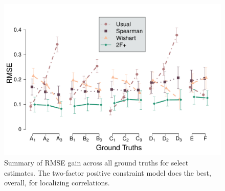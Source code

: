 \documentclass[man, 12pt]{apa7} %
\begin{document}
\begin{figure}[htbp]
    \centering  %
    \includegraphics[width=\linewidth, height=1.1\linewidth, keepaspectratio]{_figs/rmse-snap.pdf}
    \caption{Summary of RMSE gain across all ground truths for select estimates. The two-factor positive constraint model does the best, overall, for localizing correlations.} 
    \label{fig:rmse-snap}
\end{figure}
\end{document}
